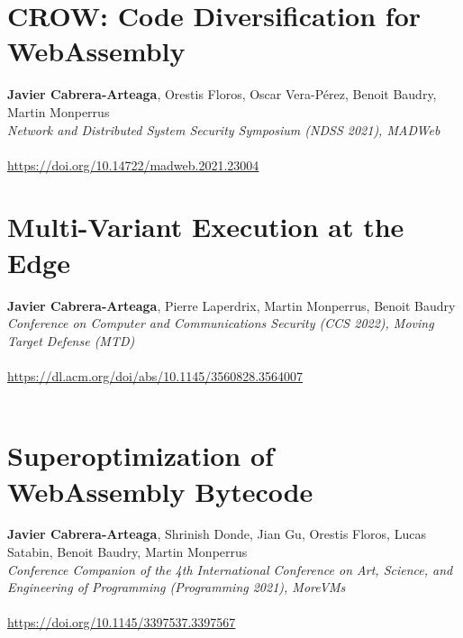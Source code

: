 %
    {} %
    {} %


\chapter{CROW: Code Diversification for WebAssembly}

\textbf{Javier Cabrera-Arteaga}, Orestis Floros, Oscar Vera-Pérez, Benoit Baudry, Martin Monperrus\\
\emph{Network and Distributed System Security Symposium (NDSS 2021), MADWeb}\\\\
\url{https://doi.org/10.14722/madweb.2021.23004}\\

%
    {} %
    {} %
    
\chapter{Multi-Variant Execution at the Edge}

\textbf{Javier Cabrera-Arteaga}, Pierre Laperdrix, Martin Monperrus, Benoit Baudry\\
\emph{Conference on Computer and Communications Security (CCS 2022), Moving Target Defense (MTD)}\\\\
 \url{https://dl.acm.org/doi/abs/10.1145/3560828.3564007}\\\\

%
    {} %
    {} %
    
  \chapter{Superoptimization of WebAssembly Bytecode}

  \textbf{Javier Cabrera-Arteaga}, Shrinish Donde, Jian Gu, Orestis Floros, Lucas Satabin, Benoit Baudry, Martin Monperrus\\
  \emph{Conference Companion of the 4th International Conference on Art, Science, and Engineering of Programming (Programming 2021), MoreVMs}\\\\
  \url{https://doi.org/10.1145/3397537.3397567}\\
  
